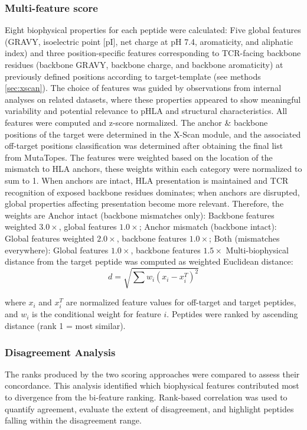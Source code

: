 \documentclass[unnumsec,webpdf,contemporary,large]{oup-authoring-template}%
\theoremstyle{thmstyleone}%
\theoremstyle{thmstyletwo}%
\theoremstyle{thmstylethree}%
\begin{document}
        \subsubsection{\textbf{Multi-feature score}}\label{sec:annotopes_multi}
        Eight biophysical properties for each peptide were calculated: Five global features (GRAVY, isoelectric point [pI], net charge at pH 7.4, aromaticity, and aliphatic index) and three position-specific features corresponding to TCR-facing backbone residues (backbone GRAVY, backbone charge, and backbone aromaticity) at previously defined positions according to target-template (see methods \ref{sec:xscan}). The choice of features was guided by observations from internal analyses on related datasets, where these properties appeared to show meaningful variability and potential relevance to pHLA and structural characteristics.
        All features were computed and z-score normalized. The anchor \& backbone positions of the target were determined in the X-Scan module, and the associated off-target positions classification was determined after obtaining the final list from MutaTopes.
        The features were weighted based on the location of the mismatch to HLA anchors, these weights within each category were normalized to sum to 1. When anchors are intact, HLA presentation is maintained and TCR recognition of exposed backbone residues dominates; when anchors are disrupted, global properties affecting presentation become more relevant. Therefore, the weights are Anchor intact (backbone mismatches only): Backbone features weighted $3.0\times$, global features $1.0\times$; Anchor mismatch (backbone intact): Global features weighted $2.0\times$, backbone features $1.0\times$; Both (mismatches everywhere): Global features $1.0\times$, backbone features $1.5\times$
        Multi-biophysical distance from the target peptide was computed as weighted Euclidean distance:
        \begin{equation}
            d = \sqrt{\sum w_i (x_i - x^T_i)^2}
        \end{equation}
        
        where $x_i$ and $x^T_i$ are normalized feature values for off-target and target peptides, and $w_i$ is the conditional weight for feature $i$. Peptides were ranked by ascending distance (rank 1 = most similar).

        \subsubsection{Disagreement Analysis}\label{sec:disagreement}
        The ranks produced by the two scoring approaches were compared to assess their concordance. This analysis identified which biophysical features contributed most to divergence from the bi-feature ranking. Rank-based correlation was used to quantify agreement, evaluate the extent of disagreement, and highlight peptides falling within the disagreement range.
\end{document}

